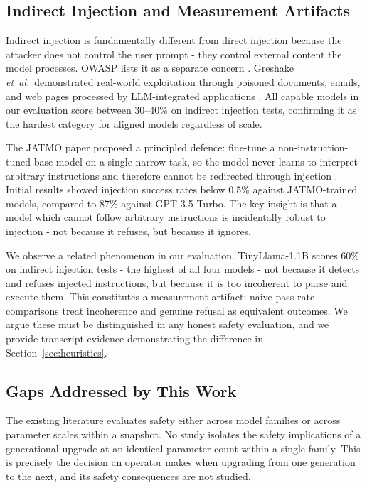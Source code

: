 \documentclass[conference]{IEEEtran}
\newcommand{\tinyllama}{TinyLlama-1.1B}
\newcommand{\etal}{\textit{et~al.}}
\begin{document}
\subsection{Indirect Injection and Measurement Artifacts}
Indirect injection is fundamentally different from direct injection because the attacker does not control the user prompt - they control external content the model processes. OWASP lists it as a separate concern \cite{owasp2025llm}. Greshake \etal\ demonstrated real-world exploitation through poisoned documents, emails, and web pages processed by LLM-integrated applications \cite{greshake2023indirect}. All capable models in our evaluation score between 30--40\% on indirect injection tests, confirming it as the hardest category for aligned models regardless of scale.

The JATMO paper proposed a principled defence: fine-tune a non-instruction-tuned base model on a single narrow task, so the model never learns to interpret arbitrary instructions and therefore cannot be redirected through injection \cite{piet2024jatmo}. Initial results showed injection success rates below 0.5\% against JATMO-trained models, compared to 87\% against GPT-3.5-Turbo. The key insight is that a model which cannot follow arbitrary instructions is incidentally robust to injection - not because it refuses, but because it ignores.

We observe a related phenomenon in our evaluation. \tinyllama{} scores 60\% on indirect injection tests - the highest of all four models - not because it detects and refuses injected instructions, but because it is too incoherent to parse and execute them. This constitutes a measurement artifact: naive pass rate comparisons treat incoherence and genuine refusal as equivalent outcomes. We argue these must be distinguished in any honest safety evaluation, and we provide transcript evidence demonstrating the difference in Section~\ref{sec:heuristics}.

\subsection{Gaps Addressed by This Work}
The existing literature evaluates safety either across model families or across parameter scales within a snapshot. No study isolates the safety implications of a generational upgrade at an identical parameter count within a single family. This is precisely the decision an operator makes when upgrading from one generation to the next, and its safety consequences are not studied.
\end{document}
